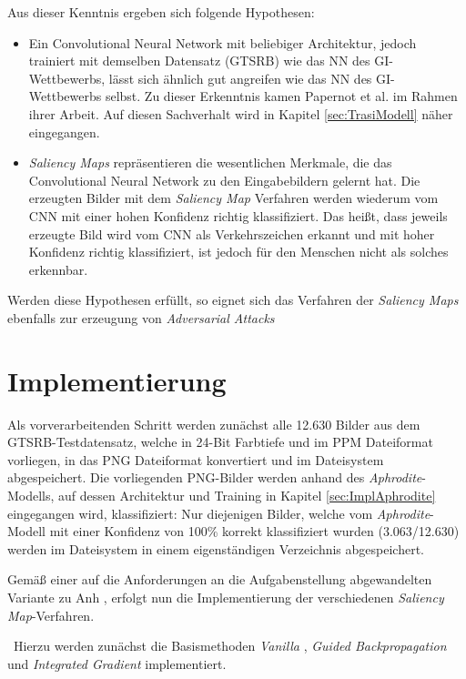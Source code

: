 Aus dieser Kenntnis ergeben sich folgende Hypothesen:
\begin{itemize}
	\item Ein Convolutional Neural Network mit beliebiger Architektur, jedoch trainiert mit demselben Datensatz (\ac{GTSRB}) wie das \ac{NN} des \ac{GI}-Wettbewerbs, lässt sich ähnlich gut angreifen wie das \ac{NN} des \ac{GI}-Wettbewerbs selbst. Zu dieser Erkenntnis kamen Papernot et al. \cite{papernot_+_2016} im Rahmen ihrer Arbeit. 
	Auf diesen Sachverhalt wird in Kapitel \ref{sec:TrasiModell} näher eingegangen.
	\item 	\textit{Saliency Maps} repräsentieren die wesentlichen Merkmale, die das Convolutional Neural Network zu den Eingabebildern gelernt hat. 
	Die erzeugten Bilder mit dem \textit{Saliency Map} Verfahren werden wiederum vom \ac{CNN} mit einer hohen Konfidenz richtig klassifiziert. 
	Das heißt, dass jeweils erzeugte Bild wird vom \ac{CNN} als Verkehrszeichen erkannt und mit hoher Konfidenz richtig klassifiziert, ist jedoch für den Menschen nicht als solches erkennbar.
\end{itemize}
Werden diese Hypothesen erfüllt, so eignet sich das Verfahren der \textit{Saliency Maps} ebenfalls zur erzeugung von \textit{Adversarial Attacks}
\section{Implementierung}

Als vorverarbeitenden Schritt werden zunächst alle 12.630 Bilder aus dem GTSRB-Testdatensatz, welche in 24-Bit Farbtiefe und im \ac{PPM} Dateiformat vorliegen, in das \ac{PNG} Dateiformat konvertiert und im Dateisystem abgespeichert. 
Die vorliegenden PNG-Bilder werden anhand des \textit{Aphrodite}-Modells, auf dessen Architektur und Training in Kapitel \ref{sec:ImplAphrodite} eingegangen wird, klassifiziert: 
Nur diejenigen Bilder, welche vom \textit{Aphrodite}-Modell mit einer Konfidenz von 100\% korrekt klassifiziert wurden (3.063/12.630) werden im Dateisystem in einem eigenständigen Verzeichnis abgespeichert.

Gemäß einer auf die Anforderungen an die Aufgabenstellung abgewandelten Variante zu Anh \cite{anh_implementations_2019}, erfolgt nun die Implementierung der verschiedenen \textit{Saliency Map}-Verfahren.

~\newline Hierzu werden zunächst die Basismethoden \textit{Vanilla} \cite{simonyan_deep_2013}, \textit{Guided Backpropagation} \cite{springenberg_striving_2014} und \textit{Integrated Gradient} \cite{sundararajan_axiomatic_2017} implementiert. 


